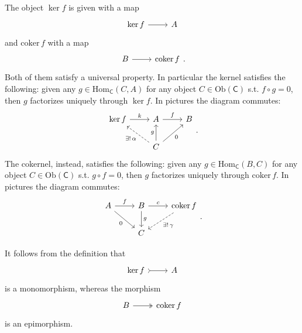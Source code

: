 \documentclass[../Main]{subfiles}
\begin{document}
\begin{rem}[]
	The object $\ker f$ is given with a map
	\begin{equation}
		\begin{tikzcd}
			\ker f \arrow[r, "", rightarrow] &
			A
		\end{tikzcd}
	\end{equation} 
	and $\mathrm{coker}\, f$ with a map
	\begin{equation}
	\begin{tikzcd}
		B \arrow[r, "", rightarrow] &
		\mathrm{coker}\,  f
	\end{tikzcd}
	.\end{equation} 
	Both of them satisfy a universal property.
	In particular the kernel satisfies the following:
	given any $g \in \mathrm{Hom}_{\mathsf{C}} \left( C, A \right)$
	for any object $C \in \mathrm{Ob} \left(\mathsf{C}\right)$ s.t.
	$f \circ g = 0$, then $g$ factorizes uniquely
	through $\ker f$.
	In pictures the diagram commutes:
	\begin{equation}
	\begin{tikzcd}
		\ker f \arrow[r, "k", rightarrow] &
		A \arrow[r, "f", rightarrow] &
		B \\
		&
		C \arrow[lu, "\exists !\, \alpha", dashrightarrow] \arrow[u, "g", rightarrow] 
		\arrow[ru, "0"', rightarrow] &
	\end{tikzcd}
	.\end{equation} 
	The cokernel, instead, satisfies the following:
	given any $g \in \mathrm{Hom}_{\mathsf{C}} \left( B, C \right)$
	for any object $C \in \mathrm{Ob} \left(\mathsf{C}\right)$ s.t.
	$g \circ f = 0$, then $g$ factorizes uniquely
	through $\mathrm{coker}\,  f$.
	In pictures the diagram commutes:
	\begin{equation}
	\begin{tikzcd}
		A \arrow[r, "f", rightarrow] \arrow[rd, "0"', rightarrow] &
		B \arrow[r, "c", rightarrow]  \arrow[d, "g", rightarrow] &
		\mathrm{coker}\, f \arrow[ld, "\exists !\, \gamma", dashrightarrow] \\
		&
		C &
	\end{tikzcd}
	.\end{equation} 
\end{rem}
\begin{rem}[]
	It follows from the definition that 
	\begin{equation}
	\begin{tikzcd}
		\ker f \arrow[r, "", rightarrowtail] &
		A
	\end{tikzcd}
	\end{equation} 
	is a monomorphism, whereas the morphism
	\begin{equation}
	\begin{tikzcd}
		B \arrow[r, "", twoheadrightarrow] &
		\mathrm{coker}\, f
	\end{tikzcd}
	\end{equation} 
	is an epimorphism.
\end{rem}
\end{document}
